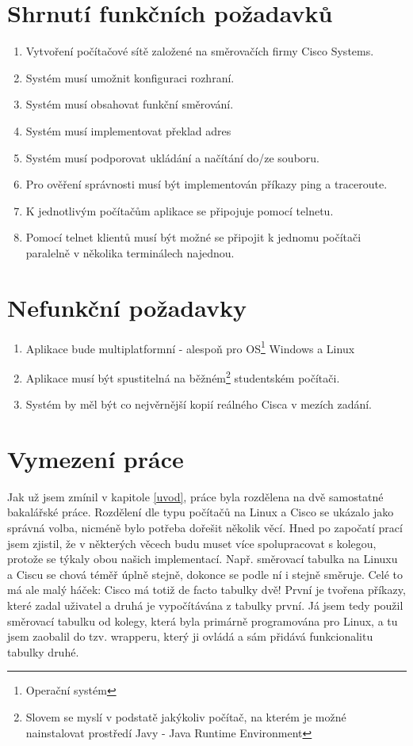 \section{Shrnutí funkčních požadavků}
\begin{enumerate}
 \item Vytvoření počítačové sítě založené na směrovačích firmy Cisco Systems.
 \item Systém musí umožnit konfiguraci rozhraní.
 \item Systém musí obsahovat funkční směrování.
 \item Systém musí implementovat překlad adres
 \item Systém musí podporovat ukládání a načítání do/ze souboru.
 \item Pro ověření správnosti musí být implementován příkazy ping a traceroute.
 \item K jednotlivým počítačům aplikace se připojuje pomocí telnetu.
 \item Pomocí telnet klientů musí být možné se připojit k jednomu počítači paralelně v několika terminálech najednou.

\end{enumerate}

\section{Nefunkční požadavky}
\begin{enumerate}
 \item Aplikace bude multiplatformní - alespoň pro OS\footnote{Operační systém} Windows a Linux
 \item Aplikace musí být spustitelná na běžném\footnote{Slovem  se myslí v podstatě jakýkoliv počítač, na kterém je možné nainstalovat prostředí Javy - Java Runtime Environment} studentském počítači.
 \item Systém by měl být co nejvěrnější kopií reálného Cisca v mezích zadání.
\end{enumerate}


\section{Vymezení práce} \label{vymezeni}
Jak už jsem zmínil v kapitole \ref{uvod}, práce byla rozdělena na dvě samostatné bakalářské práce. Rozdělení dle typu počítačů na Linux a Cisco se ukázalo jako správná volba, nicméně bylo potřeba dořešit několik věcí. Hned po započatí prací jsem zjistil, že v některých věcech budu muset více spolupracovat s kolegou, protože se týkaly obou našich implementací. Např. směrovací tabulka na Linuxu a Ciscu se chová téměř úplně stejně, dokonce se podle ní i stejně směruje. Celé to má ale malý háček: Cisco má totiž de facto tabulky dvě! První je tvořena příkazy, které zadal uživatel a druhá je vypočítávána z tabulky první. Já jsem tedy použil směrovací tabulku od kolegy, která byla primárně programována pro Linux, a tu jsem zaobalil do tzv. wrapperu, který ji ovládá a sám přidává funkcionalitu tabulky druhé. 

